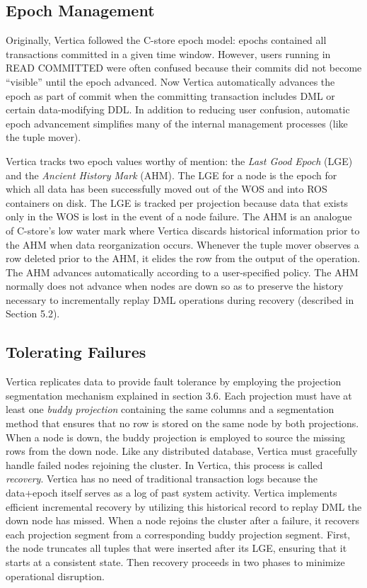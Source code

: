 \documentclass[a4paper,12pt,notitlepage,twoside,openright]{article}
\begin{document}
\hypertarget{epoch-management}{%
\subsection{Epoch Management}\label{epoch-management}}

Originally, Vertica followed the C-store epoch model: epochs contained
all transactions committed in a given time window. However, users
running in READ COMMITTED were often confused because their commits did
not become ``visible'' until the epoch advanced. Now Vertica
automatically advances the epoch as part of commit when the committing
transaction includes DML or certain data-modifying DDL. In addition to
reducing user confusion, automatic epoch advancement simplifies many of
the internal management processes (like the tuple mover).

Vertica tracks two epoch values worthy of mention: the \emph{Last Good
Epoch} (LGE) and the \emph{Ancient History Mark} (AHM). The LGE for a
node is the epoch for which all data has been successfully moved out of
the WOS and into ROS containers on disk. The LGE is tracked per
projection because data that exists only in the WOS is lost in the event
of a node failure. The AHM is an analogue of C-store's low water mark
where Vertica discards historical information prior to the AHM when data
reorganization occurs. Whenever the tuple mover observes a row deleted
prior to the AHM, it elides the row from the output of the operation.
The AHM advances automatically according to a user-specified policy. The
AHM normally does not advance when nodes are down so as to preserve the
history necessary to incrementally replay DML operations during recovery
(described in Section 5.2).

\hypertarget{tolerating-failures}{%
\subsection{Tolerating Failures}\label{tolerating-failures}}

Vertica replicates data to provide fault tolerance by employing the
projection segmentation mechanism explained in section 3.6. Each
projection must have at least one \emph{buddy projection} containing the
same columns and a segmentation method that ensures that no row is
stored on the same node by both projections. When a node is down, the
buddy projection is employed to source the missing rows from the down
node. Like any distributed database, Vertica must gracefully handle
failed nodes rejoining the cluster. In Vertica, this process is called
\emph{recovery}. Vertica has no need of traditional transaction logs
because the data+epoch itself serves as a log of past system activity.
Vertica implements efficient incremental recovery by utilizing this
historical record to replay DML the down node has missed. When a node
rejoins the cluster after a failure, it recovers each projection segment
from a corresponding buddy projection segment. First, the node truncates
all tuples that were inserted after its LGE, ensuring that it starts at
a consistent state. Then recovery proceeds in two phases to minimize
operational disruption.
\end{document}
